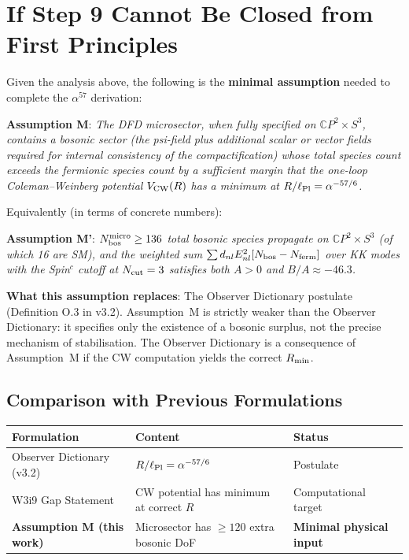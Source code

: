 \documentclass[11pt,a4paper]{article}
\newcommand{\CP}{\mathbb{C}P}
\newcommand{\lPl}{\ell_{\rm Pl}}
\newcommand{\alphafine}{\alpha}
\newcommand{\Ncut}{N_{\rm cut}}
\newcommand{\Nbos}{N_{\rm bos}}
\newcommand{\Nferm}{N_{\rm ferm}}
\begin{document}
\section{If Step 9 Cannot Be Closed from First Principles}
\label{sec:minimal-assumption}

Given the analysis above, the following is the \textbf{minimal
assumption} needed to complete the $\alpha^{57}$ derivation:

\begin{tcolorbox}[colback=green!5!white, colframe=green!60!black,
  title=\textbf{Minimal Assumption (Microsector Bosonic Content)}]

\textbf{Assumption M}: \textit{The DFD microsector, when
fully specified on $\CP^2 \times S^3$, contains a bosonic sector
(the psi-field plus additional scalar or vector fields required
for internal consistency of the compactification) whose total
species count exceeds the fermionic species count by a sufficient
margin that the one-loop Coleman--Weinberg potential $V_{\rm CW}(R)$
has a minimum at $R/\lPl = \alphafine^{-57/6}$.}

\medskip

Equivalently (in terms of concrete numbers):

\textbf{Assumption M'}: \textit{$\Nbos^{\rm micro} \geq 136$ total
bosonic species propagate on $\CP^2 \times S^3$ (of which 16 are SM),
and the weighted sum $\sum d_{nl} E_{nl}^2 [\Nbos - \Nferm]$ over
KK modes with the Spin$^c$ cutoff at $\Ncut = 3$ satisfies both
$A > 0$ and $B/A \approx -46.3$.}

\medskip

\textbf{What this assumption replaces}: The Observer Dictionary
postulate (Definition O.3 in v3.2). Assumption~M is strictly
weaker than the Observer Dictionary: it specifies only the
existence of a bosonic surplus, not the precise mechanism of
stabilisation. The Observer Dictionary is a consequence of
Assumption~M if the CW computation yields the correct
$R_{\rm min}$.

\end{tcolorbox}

\subsection{Comparison with Previous Formulations}

\begin{center}
\begin{tabular}{lll}
\toprule
\textbf{Formulation} & \textbf{Content} & \textbf{Status} \\
\midrule
Observer Dictionary (v3.2) & $R/\lPl = \alphafine^{-57/6}$
  & Postulate \\
W3i9 Gap Statement & CW potential has minimum at correct $R$
  & Computational target \\
\textbf{Assumption M (this work)} & Microsector has $\geq 120$
  extra bosonic DoF & \textbf{Minimal physical input} \\
\bottomrule
\end{tabular}
\end{center}
\end{document}
